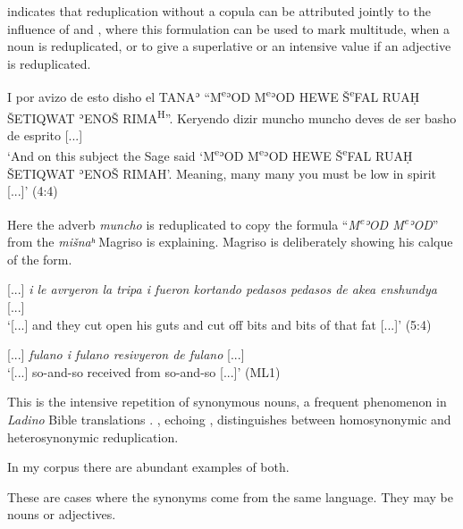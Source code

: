 \documentclass[output=paper,colorlinks,citecolor=brown,babel,arabicfont]{langscibook}
\begin{document}
\label{ch3.7.ss.3.3.6.1}

\citet[245]{bornes-varol2008} indicates that reduplication without a copula can be attributed jointly to the influence of  and , where this formulation can be used to mark multitude, when a noun is reduplicated, or to give a superlative or an intensive value if an adjective is reduplicated. 

\ea\label{ch3.7.ex.n57}
I por avizo de esto disho el TANAʾ ``M\textsuperscript{e}ʾOD M\textsuperscript{e}ʾOD HEWE Š\textsuperscript{e}FAL RUAḤ ŠETIQWAT ʾENOŠ RIMA\textsuperscript{H}''. Keryendo dizir muncho muncho deves de ser basho de esprito {[...]} \\
`And on this subject the Sage said `M\textsuperscript{e}ʾOD M\textsuperscript{e}ʾOD HEWE Š\textsuperscript{e}FAL RUAḤ ŠETIQWAT ʾENOŠ RIMAH'. Meaning, many many you must be low in spirit {[...]}' (4:4)
\z

Here the adverb \textit{muncho} is reduplicated to copy the formula ``\textit{M\textsuperscript{e}ʾOD M\textsuperscript{e}ʾOD}'' from the \textit{mišnaʰ} Magriso is explaining. Magriso is deliberately showing his calque of the  form. 


\ea\label{ch3.7.ex.n58}
{[...]} \textit{i le avryeron la tripa i fueron kortando pedasos pedasos de akea enshundya} {[...]} \\
`{[...]} and they cut open his guts and cut off bits and bits  of that fat {[...]}' (5:4)
\z

\ea\label{ch3.7.ex.n59}
{[...]} \textit{fulano i fulano resivyeron de fulano} {[...]} \\
`{[...]} so-and-so received from so-and-so {[...]}' (ML1)
\z

\label{ch3.7.ss.3.3.6.2}

This is the intensive repetition of synonymous nouns, a frequent phenomenon in \textit{Ladino} Bible translations \citep[246]{bornes-varol2008}. \citet[246--247]{bornes-varol2008}, echoing \citet{sephiha1977}, distinguishes between homosynonymic and heterosynonymic reduplication. 

In my corpus there are abundant examples of both.

\label{ch3.7.ss.3.3.6.2.1}

These are cases where the synonyms come from the same language. They may be nouns or adjectives. 
\end{document}

